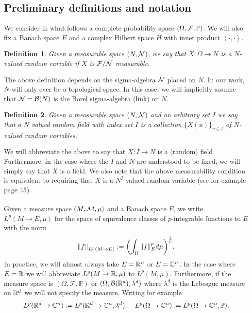 \documentclass[12pt]{article}
\newtheorem{definition}{Definition}
\newcommand{\br}[1]{\left\langle#1\right\rangle}
\begin{document}
\subsection{Preliminary definitions and notation}
We consider in what follows a complete probability space $(\Omega,\mathcal{F},\mathbb{P})$. We will also fix a Banach space $E$ and a complex Hilbert space $H$ with inner product $\br{\cdot,\cdot}$.
\begin{definition}
	Given a measurable space $(N,\mathcal{N})$, we say that $X:\Omega\to N$ is a \emph{$N$-valued random variable} if  $X$ is  $\mathcal{F}/\mathcal{N}$  measurable.
\end{definition}
The above definition depends on the sigma-algebra $\mathcal{N}$ placed on $N$. In our work, $N$ will only ever be a topological space. In this case, we will implicitly assume that $\mathcal{N}=\mathcal{B}(N)$ is the Borel sigma-algebra (link) on $N$.
\begin{definition}
	Given a measurable space $(N,\mathcal{N})$ and an arbitrary set $I$  we say that a \emph{$N$ valued random field with index set $I$} is a collection $\{X(u)\}_{u\in I} $ of $N$-valued random variables.
\end{definition}
We will abbreviate the above to say that $X: I\to N$ is a (random) field. Furthermore, in the case where the $I$ and  $N$ are understood to be fixed, we will simply say that $X$ is a field. We also note that the above measurability condition is equivalent to requiring that $X$ is a  $N^I$ valued random variable (see for example \cite{ccinlar2011probability} page 45).
\\
\\
Given a measure space $(M,\mathcal{M},\mu )$ and a Banach space $E$, we write\\
$L^p(M\to E,\mu)$ for the space of equivalence classes of $p$-integrable functions to  $E$ with the norm
\begin{equation*}
	\norm{f}_{L^p(M\to E)}:=\qty(\int_{\Omega}\norm{f}^p_E d\mu)^\frac{1}{p}.
\end{equation*}
In practice, we will almost always take $E={\mathbb R}^n$ or $E=\mathbb{C}^n$. In the case where $E={\mathbb R}$ we will abbreviate $L^p(M\to{\mathbb R},\mu)$ to $L^p(M,\mu)$. Furthermore, if the measure space is $(\Omega,\mathcal{F},\mathbb{P})$ or $(\Omega,\mathcal{B}({\mathbb R}^d),\lambda^d)$ where $\lambda^d$ is the Lebesgue measure on ${\mathbb R}^d$ we will not specify the measure. Writing for example
\begin{equation*}
	L^p({\mathbb R}^d\to\mathbb{C}^n):=L^p({\mathbb R}^d\to\mathbb{C}^n,\lambda^d);\quad L^p(\Omega\to\mathbb{C}^n):=L^p(\Omega\to\mathbb{C}^n,\mathbb{P}).
\end{equation*}
\end{document}
